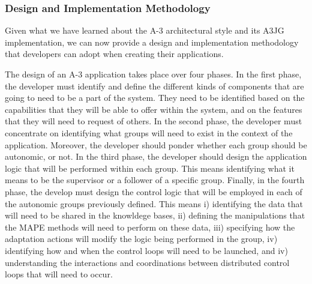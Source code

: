 
\subsubsection{Design and Implementation Methodology} %
\label{subsub:design_methodology}

Given what we have learned about the A-3 architectural style and its A3JG implementation, we can now provide a design and implementation methodology that developers can adopt when creating their applications.

The design of an A-3 application takes place over four phases. In the first phase, the developer must identify and define the different kinds of components that are going to need to be a part of the system. They need to be identified based on the capabilities that they will be able to offer within the system, and on the features that they will need to request of others. In the second phase, the developer must concentrate on identifying what groups will need to exist in the context of the application. Moreover, the developer should ponder whether each group should be autonomic, or not. In the third phase, the developer should design the application logic that will be performed within each group. This means  identifying what it means to be the supervisor or a follower of a specific group. Finally, in the fourth phase, the develop must design the control logic that will be employed in each of the autonomic groups previously defined. This means i) identifying the data that will need to be shared in the knowldege bases, ii) defining the  manipulations that the MAPE methods will need to perform on these data, iii) specifying how the adaptation actions will modify the logic being performed in the group, iv) identifying how and when the control loops will need to be launched, and iv) understanding the interactions and coordinations between distributed control loops that will need to occur.  

